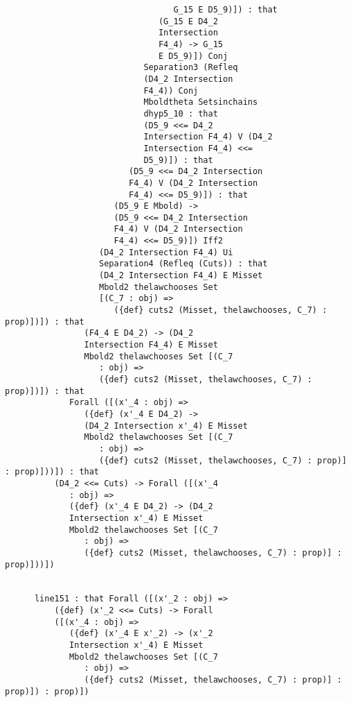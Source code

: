 \documentclass[12pt]{article}
\begin{document}
\begin{verbatim}
                                  G_15 E D5_9)]) : that 
                               (G_15 E D4_2 
                               Intersection 
                               F4_4) -> G_15 
                               E D5_9)]) Conj 
                            Separation3 (Refleq 
                            (D4_2 Intersection 
                            F4_4)) Conj 
                            Mboldtheta Setsinchains 
                            dhyp5_10 : that 
                            (D5_9 <<= D4_2 
                            Intersection F4_4) V (D4_2 
                            Intersection F4_4) <<= 
                            D5_9)]) : that 
                         (D5_9 <<= D4_2 Intersection 
                         F4_4) V (D4_2 Intersection 
                         F4_4) <<= D5_9)]) : that 
                      (D5_9 E Mbold) -> 
                      (D5_9 <<= D4_2 Intersection 
                      F4_4) V (D4_2 Intersection 
                      F4_4) <<= D5_9)]) Iff2 
                   (D4_2 Intersection F4_4) Ui 
                   Separation4 (Refleq (Cuts)) : that 
                   (D4_2 Intersection F4_4) E Misset 
                   Mbold2 thelawchooses Set 
                   [(C_7 : obj) => 
                      ({def} cuts2 (Misset, thelawchooses, C_7) : prop)])]) : that 
                (F4_4 E D4_2) -> (D4_2 
                Intersection F4_4) E Misset 
                Mbold2 thelawchooses Set [(C_7 
                   : obj) => 
                   ({def} cuts2 (Misset, thelawchooses, C_7) : prop)])]) : that 
             Forall ([(x'_4 : obj) => 
                ({def} (x'_4 E D4_2) -> 
                (D4_2 Intersection x'_4) E Misset 
                Mbold2 thelawchooses Set [(C_7 
                   : obj) => 
                   ({def} cuts2 (Misset, thelawchooses, C_7) : prop)] : prop)]))]) : that 
          (D4_2 <<= Cuts) -> Forall ([(x'_4 
             : obj) => 
             ({def} (x'_4 E D4_2) -> (D4_2 
             Intersection x'_4) E Misset 
             Mbold2 thelawchooses Set [(C_7 
                : obj) => 
                ({def} cuts2 (Misset, thelawchooses, C_7) : prop)] : prop)]))])


      line151 : that Forall ([(x'_2 : obj) => 
          ({def} (x'_2 <<= Cuts) -> Forall 
          ([(x'_4 : obj) => 
             ({def} (x'_4 E x'_2) -> (x'_2 
             Intersection x'_4) E Misset 
             Mbold2 thelawchooses Set [(C_7 
                : obj) => 
                ({def} cuts2 (Misset, thelawchooses, C_7) : prop)] : prop)]) : prop)])



\end{verbatim}
\end{document}
